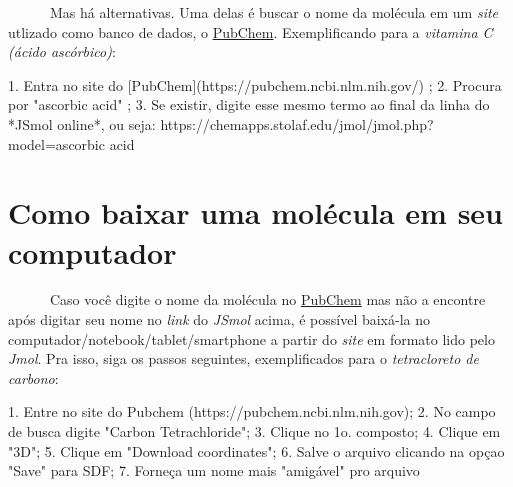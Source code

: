 \documentclass[
  letterpaper,
  DIV=11,
  numbers=noendperiod]{scrreprt}
\newenvironment{Shaded}{\begin{snugshade}}{\end{snugshade}}
\newcommand{\DecValTok}[1]{\textcolor[rgb]{0.68,0.00,0.00}{#1}}
\newcommand{\ErrorTok}[1]{\textcolor[rgb]{0.68,0.00,0.00}{#1}}
\newcommand{\FloatTok}[1]{\textcolor[rgb]{0.68,0.00,0.00}{#1}}
\newcommand{\FunctionTok}[1]{\textcolor[rgb]{0.28,0.35,0.67}{#1}}
\newcommand{\NormalTok}[1]{\textcolor[rgb]{0.00,0.23,0.31}{#1}}
\newcommand{\OtherTok}[1]{\textcolor[rgb]{0.00,0.23,0.31}{#1}}
\newcommand{\SpecialCharTok}[1]{\textcolor[rgb]{0.37,0.37,0.37}{#1}}
\newcommand{\StringTok}[1]{\textcolor[rgb]{0.13,0.47,0.30}{#1}}
\begin{document}
~~~~~~Mas há alternativas. Uma delas é buscar o nome da molécula em um
\emph{site} utlizado como banco de dados, o
\href{https://pubchem.ncbi.nlm.nih.gov/}{PubChem}. Exemplificando para a
\emph{vitamina C (ácido ascórbico)}:

\hfill\break

\begin{Shaded}
\begin{Highlighting}[]
\FloatTok{1.}\NormalTok{ Entra no site do [PubChem](https}\SpecialCharTok{:}\ErrorTok{//}\NormalTok{pubchem.ncbi.nlm.nih.gov}\SpecialCharTok{/}\NormalTok{) ;}
\FloatTok{2.}\NormalTok{ Procura por }\StringTok{"ascorbic acid"}\NormalTok{ ;}
\FloatTok{3.}\NormalTok{ Se existir, digite esse mesmo termo ao final da linha do }\SpecialCharTok{*}\NormalTok{JSmol online}\SpecialCharTok{*}\NormalTok{, ou seja}\SpecialCharTok{:}
\NormalTok{    https}\SpecialCharTok{:}\ErrorTok{//}\NormalTok{chemapps.stolaf.edu}\SpecialCharTok{/}\NormalTok{jmol}\SpecialCharTok{/}\NormalTok{jmol.php?model}\OtherTok{=}\NormalTok{ascorbic acid}
\end{Highlighting}
\end{Shaded}

\section{Como baixar uma molécula em seu
computador}\label{como-baixar-uma-moluxe9cula-em-seu-computador}

~~~~~~Caso você digite o nome da molécula no
\href{https://pubchem.ncbi.nlm.nih.gov/}{PubChem} mas não a encontre
após digitar seu nome no \emph{link} do \emph{JSmol} acima, é possível
baixá-la no computador/notebook/tablet/smartphone a partir do
\emph{site} em formato lido pelo \emph{Jmol}. Pra isso, siga os passos
seguintes, exemplificados para o \emph{tetracloreto de carbono}:

\begin{Shaded}
\begin{Highlighting}[]
\FloatTok{1.}\NormalTok{ Entre no site do }\FunctionTok{Pubchem}\NormalTok{ (https}\SpecialCharTok{:}\ErrorTok{//}\NormalTok{pubchem.ncbi.nlm.nih.gov);}
\FloatTok{2.}\NormalTok{ No campo de busca digite }\StringTok{"Carbon Tetrachloride"}\NormalTok{;}
\FloatTok{3.}\NormalTok{ Clique no }\DecValTok{1}\NormalTok{o. composto;}
\FloatTok{4.}\NormalTok{ Clique em }\StringTok{"3D"}\NormalTok{;}
\FloatTok{5.}\NormalTok{ Clique em }\StringTok{"Download coordinates"}\NormalTok{;}
\FloatTok{6.}\NormalTok{ Salve o arquivo clicando na opçao }\StringTok{"Save"}\NormalTok{ para SDF;}
\FloatTok{7.}\NormalTok{ Forneça um nome mais }\StringTok{"amigável"}\NormalTok{ pro arquivo}
\end{Highlighting}
\end{Shaded}
\end{document}
